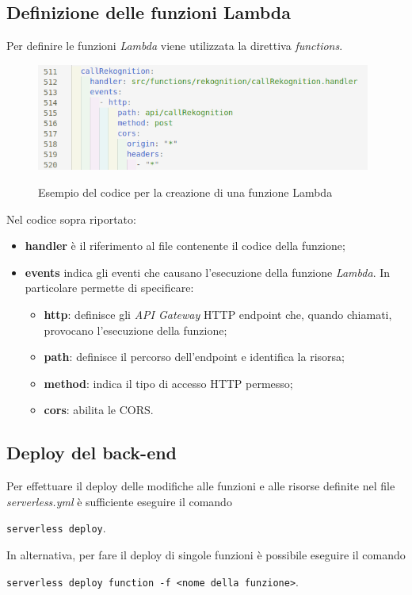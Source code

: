 	\subsection{Definizione delle funzioni Lambda}
	Per definire le funzioni \emph{Lambda} viene utilizzata la direttiva \emph{functions}. 
	
	\begin{figure}[H]
		\centering
		\includegraphics[width=11cm]{immagini/lambda.png} \\
		\caption{\label{fig:lambda} Esempio del codice per la creazione di una funzione Lambda}
	\end{figure}

	Nel codice sopra riportato:
	\begin{itemize}
		\item \textbf{handler} è il riferimento al file contenente il codice della funzione; 
		\item \textbf{events} indica gli eventi che causano l'esecuzione della funzione \emph{Lambda}. In particolare permette di specificare:
		\begin{itemize}
			\item \textbf{http}: definisce gli \emph{API Gateway} HTTP endpoint che, quando chiamati, provocano l'esecuzione della funzione;
			\item \textbf{path}: definisce il percorso dell'endpoint e identifica la risorsa;
			\item \textbf{method}: indica il tipo di accesso HTTP permesso;
			\item \textbf{cors}: abilita le \gls{CORS}.
		\end{itemize}
		 
	\end{itemize}
	
	\subsection{Deploy del back-end}
	Per effettuare il \gls{deploy} delle modifiche alle funzioni e alle risorse definite nel file \emph{serverless.yml} è sufficiente eseguire il comando
	\begin{center}
		\texttt{serverless deploy}.
	\end{center} 
	In alternativa, per fare il \gls{deploy} di singole funzioni è possibile eseguire il comando 
	\begin{center}
		\texttt{serverless deploy function -f <nome della funzione>}.
	\end{center}

